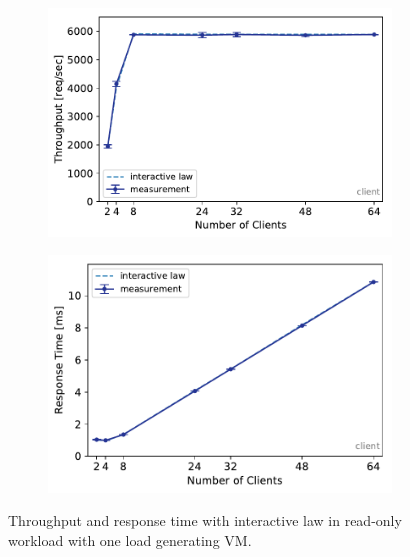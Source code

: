\documentclass[report.tex]{subfiles}
\begin{document}
\begin{figure}
	\begin{subfigure}[b]{.49\linewidth}
		\centering
		\includegraphics[width=\linewidth]{data/exp22_ro_tp_nc.pdf}
	\end{subfigure}\hfill
	\begin{subfigure}[b]{.49\linewidth}
		\centering
		\includegraphics[width=\linewidth]{data/exp22_ro_rt_nc.pdf}
	\end{subfigure}%
	\caption{Throughput and response time with interactive law in read-only workload with one load generating VM.}
	\label{exp22_ro_nc}
\end{figure}
\end{document}
